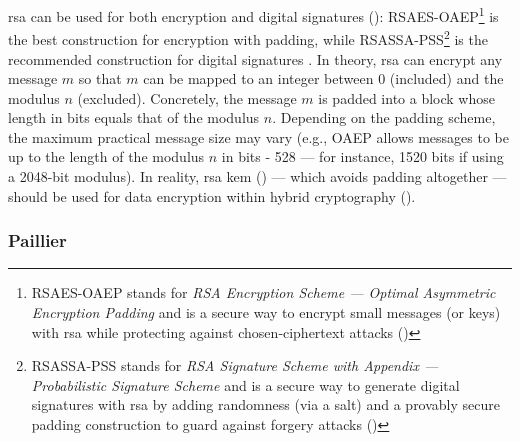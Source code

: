 \gls{rsa} can be used for both encryption and digital signatures (): RSAES-OAEP\footnote{RSAES-OAEP stands for \textit{RSA Encryption Scheme --- Optimal Asymmetric Encryption Padding} and is a secure way to encrypt small messages (or keys) with \gls{rsa} while protecting against chosen‐ciphertext attacks ()} is the best construction for encryption with padding, while RSASSA-PSS\footnote{RSASSA-PSS stands for \textit{RSA Signature Scheme with Appendix --- Probabilistic Signature Scheme} and is a secure way to generate digital signatures with \gls{rsa} by adding randomness (via a salt) and a provably secure padding construction to guard against forgery attacks ()} is the recommended construction for digital signatures \cite{rfc8017}. In theory, \gls{rsa} can encrypt any message $m$ so that $m$ can be mapped to an integer between $0$ (included) and the modulus $n$ (excluded). Concretely, the message $m$ is padded into a block whose length in bits equals that of the modulus $n$. Depending on the padding scheme, the maximum practical message size may vary (e.g., OAEP allows messages to be up to the length of the modulus $n$ in bits - 528 --- for instance, 1520 bits if using a 2048-bit modulus). In reality, \gls{rsa} \gls{kem} () --- which avoids padding altogether --- should be used for data encryption within hybrid cryptography ().




\subsubsection{Paillier}\label{sec:asymmetric_cryptography:ciphers:paillier}
		
